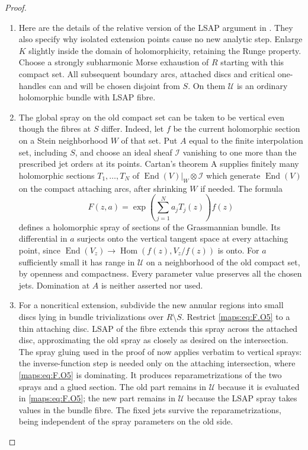 \documentclass[11pt,a4paper]{article}
\theoremstyle{definition}
\begin{document}
\begin{proof}
\begin{enumerate}[label=\arabic*.]
\item Here are the details of the relative version of the LSAP argument
in \cite[Lemma 5.1, Theorem 6.1 and Proposition 7.13(d)]
{IVVOkaOneV5}.  They also specify why isolated extension
points cause no new analytic step.  Enlarge $K$ slightly inside
the domain of holomorphicity, retaining the Runge property.
Choose a strongly subharmonic Morse exhaustion of $R$ starting
with this compact set.  All subsequent boundary arcs, attached
discs and critical one-handles can and will be chosen disjoint
from $S$.  On them $\mathscr U$ is an ordinary holomorphic
bundle with LSAP fibre.

\item The global spray on the old compact set can be taken to be
vertical even though the fibres at $S$ differ.  Indeed, let $f$
be the current holomorphic section on a Stein neighborhood $W$
of that set.  Put $A$ equal to the finite interpolation set,
including $S$, and choose an ideal sheaf $\mathcal I$ vanishing
to one more than the prescribed jet orders at its points.
Cartan's theorem A supplies finitely many holomorphic sections
$T_1,\ldots,T_N$ of
$\operatorname{End}(V)|_W\otimes\mathcal I$ which generate
$\operatorname{End}(V)$ on the compact attaching arcs, after
shrinking $W$ if needed.  The formula
\[
 F(z,a)=\exp\left(\sum_{j=1}^N a_jT_j(z)\right)f(z)
 \tag{F.O5}\label{maps:eq:F.O5}
\]
defines a holomorphic spray of sections of the Grassmannian
bundle.  Its differential in $a$ surjects onto the vertical
tangent space at every attaching point, since
$\operatorname{End}(V_z)\to
\operatorname{Hom}(f(z),V_z/f(z))$ is onto.
For $a$ sufficiently small it has range in $\mathscr U$ on
a neighborhood of the old compact set, by openness and
compactness.  Every parameter value preserves all the chosen
jets.  Domination at $A$ is neither asserted nor used.

\item For a noncritical extension, subdivide the new annular regions
into small discs lying in bundle trivializations over
$R\setminus S$.  Restrict \eqref{maps:eq:F.O5} to a thin attaching disc.
LSAP of the fibre extends this spray across the attached disc,
approximating the old spray as closely as desired on the
intersection.  The spray gluing used in the proof of
\cite[Lemma 5.1, equations (5.6)--(5.8)]
{IVVOkaOneV5} now applies verbatim to vertical sprays:
the inverse-function step is needed only on the attaching
intersection, where \eqref{maps:eq:F.O5} is dominating.  It produces
reparametrizations of the two sprays and a glued section.
The old part remains in $\mathscr U$ because it is evaluated
in \eqref{maps:eq:F.O5}; the new part remains in $\mathscr U$ because the
LSAP spray takes values in the bundle fibre.  The fixed jets
survive the reparametrizations, being independent of the
spray parameters on the old side.


\end{enumerate}
\end{proof}
\end{document}
